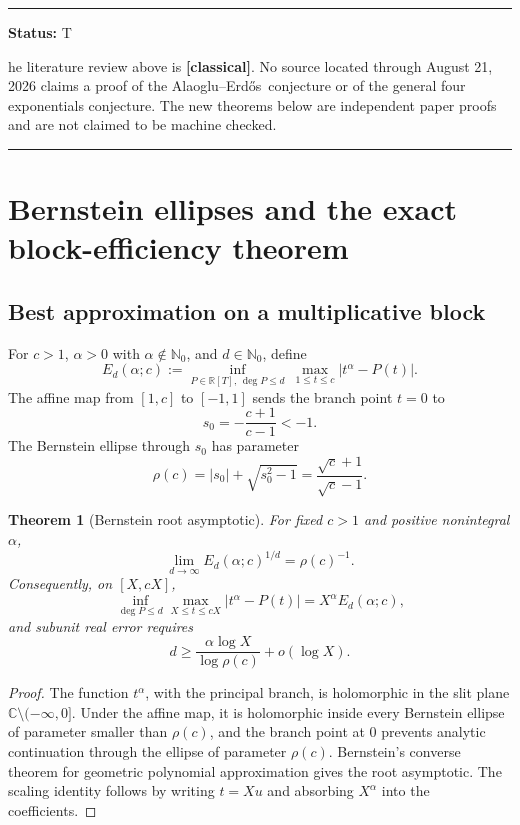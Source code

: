 \documentclass[11pt,oneside]{article}
\newtheorem{theorem}{Theorem}[section]
\theoremstyle{definition}
\theoremstyle{remark}
\newcommand{\Nzero}{\mathbb N_0}
\newcommand{\R}{\mathbb R}
\newcommand{\C}{\mathbb C}
\newcommand{\AEname}{Alaoglu--Erd\H{o}s}
\newcommand{\statusclassical}{\textcolor{classicalgray}{\textbf{[classical]}}}
\newenvironment{statusbox}[1]
{\begin{center}\begin{minipage}{0.94\textwidth}\raggedright\hrule\vspace{0.45em}\textbf{Status:} #1\par\vspace{0.35em}}
{\vspace{0.35em}\hrule\end{minipage}\end{center}}
\begin{document}
\begin{statusbox}
The literature review above is \statusclassical.  No source located through August 21, 2026
claims a proof of the \AEname\ conjecture or of the general four exponentials conjecture.
The new theorems below are independent paper proofs and are not claimed to be machine checked.
\end{statusbox}

\section{Bernstein ellipses and the exact block-efficiency theorem}
\label{sec:bernstein}

\subsection{Best approximation on a multiplicative block}

For $c>1$, $\alpha>0$ with $\alpha\notin\Nzero$, and $d\in\Nzero$, define
\[
 E_d(\alpha;c):=
 \inf_{P\in\R[T],\,\deg P\le d}\ 
 \max_{1\le t\le c}|t^\alpha-P(t)|.
\]
The affine map from $[1,c]$ to $[-1,1]$ sends the branch point $t=0$ to
\[
 s_0=-\frac{c+1}{c-1}<-1.
\]
The Bernstein ellipse through $s_0$ has parameter
\begin{equation}
 \rho(c)=|s_0|+\sqrt{s_0^2-1}
 =\frac{\sqrt c+1}{\sqrt c-1}.
 \label{eq:rho}
\end{equation}

\begin{theorem}[Bernstein root asymptotic]
\label{thm:bernstein-root}
For fixed $c>1$ and positive nonintegral $\alpha$,
\[
 \lim_{d\to\infty} E_d(\alpha;c)^{1/d}=\rho(c)^{-1}.
\]
Consequently, on $[X,cX]$,
\[
 \inf_{\deg P\le d}\max_{X\le t\le cX}|t^\alpha-P(t)|
 =X^\alpha E_d(\alpha;c),
\]
and subunit real error requires
\begin{equation}
 d\ge \frac{\alpha\log X}{\log\rho(c)}+o(\log X).
 \label{eq:degree-need}
\end{equation}
\end{theorem}

\begin{proof}
The function $t^\alpha$, with the principal branch, is holomorphic in the slit plane
$\C\setminus(-\infty,0]$.  Under the affine map, it is holomorphic inside every Bernstein
ellipse of parameter smaller than $\rho(c)$, and the branch point at $0$ prevents analytic
continuation through the ellipse of parameter $\rho(c)$.  Bernstein's converse theorem for
geometric polynomial approximation gives the root asymptotic.  The scaling identity follows
by writing $t=Xu$ and absorbing $X^\alpha$ into the coefficients.
\end{proof}
\end{document}

